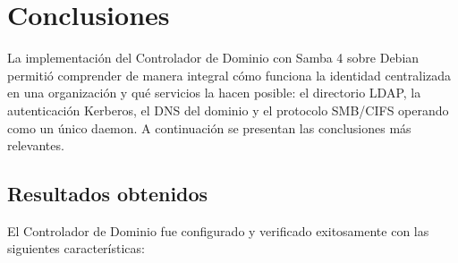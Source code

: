 
\section{Conclusiones}

La implementación del Controlador de Dominio con Samba 4 sobre Debian
permitió comprender de manera integral cómo funciona la identidad centralizada
en una organización y qué servicios la hacen posible: el directorio LDAP, la
autenticación Kerberos, el DNS del dominio y el protocolo SMB/CIFS operando
como un único daemon. A continuación se presentan las conclusiones más
relevantes.

\subsection{Resultados obtenidos}

El Controlador de Dominio fue configurado y verificado exitosamente con las
siguientes características:


